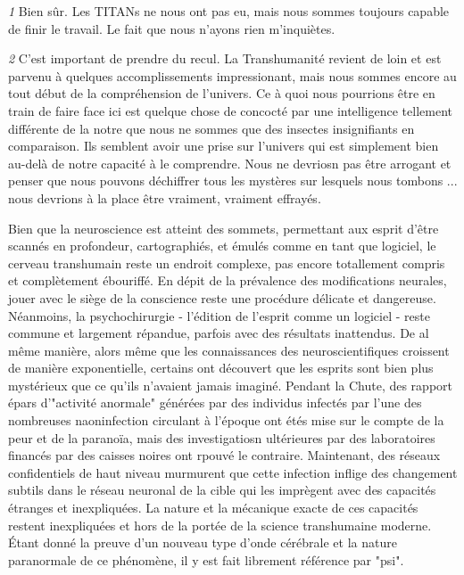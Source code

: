 \textit{\textit{1}} Bien sûr. Les TITANs ne nous ont pas eu, mais nous sommes toujours capable de finir le travail. Le fait que nous n'ayons rien m'inquiètes. 

\textit{\textit{2}} C'est important de prendre du recul. La Transhumanité revient de loin et est parvenu à quelques accomplissements impressionant, mais nous sommes encore au tout début de la compréhension de l'univers. Ce à quoi nous pourrions être en train de faire face ici est quelque chose de concocté par une intelligence tellement différente de la notre que nous ne sommes que des insectes insignifiants en comparaison. Ils semblent avoir une prise sur l'univers qui est simplement bien au-delà de notre capacité à le comprendre. Nous ne devriosn pas être arrogant et penser que nous pouvons déchiffrer tous les mystères sur lesquels nous tombons ... nous devrions à la place être vraiment, vraiment effrayés. 

\newpage



Bien que la neuroscience est atteint des sommets, permettant aux esprit d'être scannés en profondeur, cartographiés, et émulés comme en tant que logiciel, le cerveau transhumain reste un endroit complexe, pas encore totallement compris et complètement ébouriffé. En dépit de la prévalence des modifications neurales, jouer avec le siège de la conscience reste une procédure délicate et dangereuse. Néanmoins, la psychochirurgie - l'édition de l'esprit comme un logiciel - reste commune et largement répandue, parfois avec des résultats inattendus. De al même manière, alors même que les connaissances des neuroscientifiques croissent de manière exponentielle, certains ont découvert que les esprits sont bien plus mystérieux que ce qu'ils n'avaient jamais imaginé. Pendant la Chute, des rapport épars d'"activité anormale" générées par des individus infectés par l'une des nombreuses naoninfection circulant à l'époque ont étés mise sur le compte de la peur et de la paranoïa, mais des investigatiosn ultérieures par des laboratoires financés par des caisses noires ont rpouvé le contraire. Maintenant, des réseaux confidentiels de haut niveau murmurent que cette infection inflige des changement subtils dans le réseau neuronal de la cible qui les imprègent avec des capacités étranges et inexpliquées. La nature et la mécanique exacte de ces capacités restent inexpliquées et hors de la portée de la science transhumaine moderne. Étant donné la preuve d'un nouveau type d'onde cérébrale et la nature paranormale de ce phénomène, il y est fait librement référence par "psi". 

